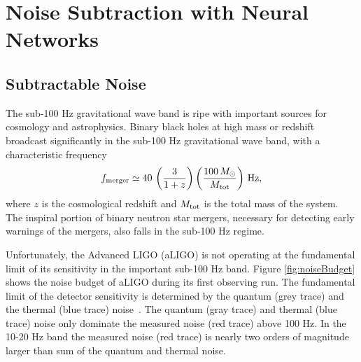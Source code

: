 \chapter{Noise Subtraction with Neural Networks}
\label{chap:nohair}

\begin{refsection}

\section{Subtractable Noise}

The sub-100 Hz gravitational wave band is ripe with important sources for cosmology and astrophysics. Binary black holes at high mass or redshift broadcast significantly in the sub-100 Hz gravitational wave band, with a characteristic frequency
\begin{equation}
f_{\rm merger} \simeq 40\,\left(\frac{3}{1+z}\right)\left(\frac{100\,M_\odot}{M_{\rm tot}}\right)\,{\rm Hz},
\end{equation}
where $z$ is the cosmological redshift and $M_{\rm tot}$ is the total mass of the system. The inspiral portion of binary neutron star mergers, necessary for detecting early warnings of the mergers, also falls in the sub-100 Hz regime. 

Unfortunately, the Advanced LIGO (aLIGO) is not operating at the fundamental limit of its sensitivity in the important sub-100 Hz band. Figure 
\ref{fig:noiseBudget} 
shows the noise budget of aLIGO during its first observing run. The fundamental limit of the detector sensitivity is determined by the quantum (grey trace) and the thermal (blue trace) noise~\cite{Martynov:16}. The quantum (gray trace) and thermal (blue trace) noise only dominate the measured noise (red trace) above 100 Hz. In the 10-20 Hz band the measured noise (red trace) is nearly two orders of magnitude larger than sum of the quantum and thermal noise.


\end{refsection}
